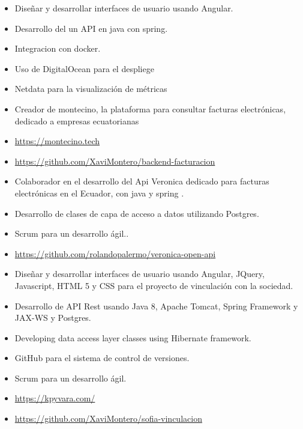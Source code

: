\documentclass[10pt,a4paper,ragged2e]{altacv}
\begin{document}
\begin{itemize}
    \item Diseñar y desarrollar interfaces de usuario usando Angular.
    \item Desarrollo del un API en java con spring.
    \item Integracion con docker.
    \item Uso de DigitalOcean para el despliege 
    \item Netdata para la visualización de métricas
    \item Creador de montecino, la  plataforma para consultar facturas electrónicas, dedicado a empresas ecuatorianas
    \item \url{https://montecino.tech}
    \item \url{https://github.com/XaviMontero/backend-facturacion}
\end{itemize}

\vspace{10px}

\begin{itemize}
    \item Colaborador en el desarrollo del Api Veronica dedicado para facturas electrónicas en el Ecuador, con java y spring .
    \item Desarrollo de clases de capa de acceso a datos utilizando Postgres.
    \item Scrum para un desarrollo ágil..
    \item \url{https://github.com/rolandopalermo/veronica-open-api}
\end{itemize}
\vspace{10px}

\begin{itemize}
   \item Diseñar y desarrollar interfaces de usuario usando Angular, JQuery, Javascript, HTML 5 y CSS para el proyecto de vinculación con la sociedad.
   \item Desarrollo de API Rest usando Java 8, Apache Tomcat, Spring Framework y JAX-WS y Postgres.
   \item Developing data access layer classes using Hibernate framework.
   \item GitHub para el sistema de control de versiones.
   \item Scrum para un desarrollo ágil.
   \item \url{https://kpyvara.com/}
   \item \url{https://github.com/XaviMontero/sofia-vinculacion}
\end{itemize}
\end{document}
